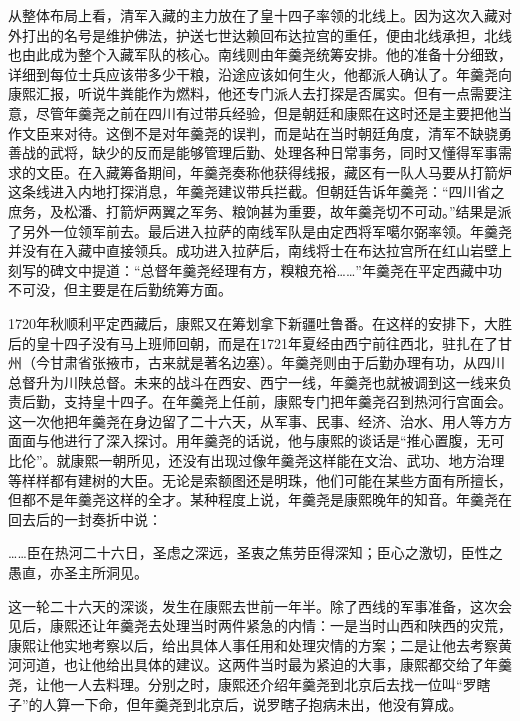 从整体布局上看，清军入藏的主力放在了皇十四子率领的北线上。因为这次入藏对外打出的名号是维护佛法，护送七世达赖回布达拉宫的重任，便由北线承担，北线也由此成为整个入藏军队的核心。南线则由年羹尧统筹安排。他的准备十分细致，详细到每位士兵应该带多少干粮，沿途应该如何生火，他都派人确认了。年羹尧向康熙汇报，听说牛粪能作为燃料，他还专门派人去打探是否属实。但有一点需要注意，尽管年羹尧之前在四川有过带兵经验，但是朝廷和康熙在这时还是主要把他当作文臣来对待。这倒不是对年羹尧的误判，而是站在当时朝廷角度，清军不缺骁勇善战的武将，缺少的反而是能够管理后勤、处理各种日常事务，同时又懂得军事需求的文臣。在入藏筹备期间，年羹尧奏称他获得线报，藏区有一队人马要从打箭炉这条线进入内地打探消息，年羹尧建议带兵拦截。但朝廷告诉年羹尧：“四川省之庶务，及松潘、打箭炉两翼之军务、粮饷甚为重要，故年羹尧切不可动。”结果是派了另外一位领军前去。最后进入拉萨的南线军队是由定西将军噶尔弼率领。年羹尧并没有在入藏中直接领兵。成功进入拉萨后，南线将士在布达拉宫所在红山岩壁上刻写的碑文中提道：“总督年羹尧经理有方，糗粮充裕……”年羹尧在平定西藏中功不可没，但主要是在后勤统筹方面。



1720年秋顺利平定西藏后，康熙又在筹划拿下新疆吐鲁番。在这样的安排下，大胜后的皇十四子没有马上班师回朝，而是在1721年夏经由西宁前往西北，驻扎在了甘州（今甘肃省张掖市，古来就是著名边塞）。年羹尧则由于后勤办理有功，从四川总督升为川陕总督。未来的战斗在西安、西宁一线，年羹尧也就被调到这一线来负责后勤，支持皇十四子。在年羹尧上任前，康熙专门把年羹尧召到热河行宫面会。这一次他把年羹尧在身边留了二十六天，从军事、民事、经济、治水、用人等方方面面与他进行了深入探讨。用年羹尧的话说，他与康熙的谈话是“推心置腹，无可比伦”。就康熙一朝所见，还没有出现过像年羹尧这样能在文治、武功、地方治理等样样都有建树的大臣。无论是索额图还是明珠，他们可能在某些方面有所擅长，但都不是年羹尧这样的全才。某种程度上说，年羹尧是康熙晚年的知音。年羹尧在回去后的一封奏折中说：



\begin{bookquote}……臣在热河二十六日，圣虑之深远，圣衷之焦劳臣得深知；臣心之激切，臣性之愚直，亦圣主所洞见。\end{bookquote}


这一轮二十六天的深谈，发生在康熙去世前一年半。除了西线的军事准备，这次会见后，康熙还让年羹尧去处理当时两件紧急的内情：一是当时山西和陕西的灾荒，康熙让他实地考察以后，给出具体人事任用和处理灾情的方案；二是让他去考察黄河河道，也让他给出具体的建议。这两件当时最为紧迫的大事，康熙都交给了年羹尧，让他一人去料理。分别之时，康熙还介绍年羹尧到北京后去找一位叫“罗瞎子”的人算一下命，但年羹尧到北京后，说罗瞎子抱病未出，他没有算成。


